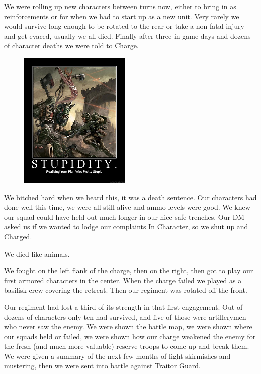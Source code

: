 We were rolling up new characters between turns now, either to bring in as reinforcements or for when we had to start up as a new unit.
Very rarely we would survive long enough to be rotated to the rear or take a non-fatal injury and get evaced, usually we all died.
Finally after three in game days and dozens of character deaths we were told to Charge.

\begin{figure}
	\begin{center}
		\includegraphics[width=\figwidth]{pics/1/4.png}
	\end{center}
\end{figure}
We bitched hard when we heard this, it was a death sentence.
Our characters had done well this time, we were all still alive and ammo levels were good.
We knew our squad could have held out much longer in our nice safe trenches.
Our DM asked us if we wanted to lodge our complaints In Character, so we shut up and Charged. 

We died like animals.

We fought on the left flank of the charge, then on the right, then got to play our first armored characters in the center.
When the charge failed we played as a basilisk crew covering the retreat. Then our regiment was rotated off the front.

Our regiment had lost a third of its strength in that first engagement.
Out of dozens of characters only ten had survived, and five of those were artillerymen who never saw the enemy.
We were shown the battle map, we were shown where our squads held or failed, we were shown how our charge weakened the enemy for the fresh (and much more valuable) reserve troops to come up and break them.
We were given a summary of the next few months of light skirmishes and mustering, then we were sent into battle against Traitor Guard.

